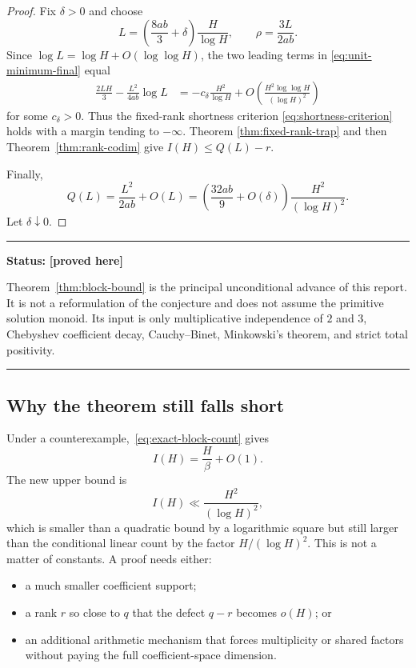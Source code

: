 \documentclass[11pt,oneside]{article}
\theoremstyle{definition}
\theoremstyle{remark}
\newcommand{\statusproved}{\textcolor{provedgreen}{\textbf{[proved here]}}}
\newenvironment{statusbox}[1]
{\begin{center}\begin{minipage}{0.94\textwidth}\raggedright\hrule\vspace{0.45em}\textbf{Status:} #1\par\vspace{0.35em}}
{\vspace{0.35em}\hrule\end{minipage}\end{center}}
\begin{document}
\begin{proof}
Fix $\delta>0$ and choose
\begin{equation}
 L=\left(\frac{8ab}{3}+\delta\right)\frac{H}{\log H},
 \qquad
 \rho=\frac{3L}{2ab}.
 \label{eq:Lchoice}
\end{equation}
Since $\log L=\log H+O(\log\log H)$, the two leading terms in
\eqref{eq:unit-minimum-final} equal
\begin{align*}
 \frac{2LH}{3}-\frac{L^2}{4ab}\log L
 &=-c_\delta\frac{H^2}{\log H}
   +O\!\left(\frac{H^2\log\log H}{(\log H)^2}\right)
\end{align*}
for some $c_\delta>0$.  Thus the fixed-rank shortness criterion
\eqref{eq:shortness-criterion} holds with a margin tending to $-\infty$.  Theorem
\ref{thm:fixed-rank-trap} and then Theorem~\ref{thm:rank-codim} give
$I(H)\le Q(L)-r$.

Finally,
\[
 Q(L)=\frac{L^2}{2ab}+O(L)
 =\left(\frac{32ab}{9}+O(\delta)\right)
   \frac{H^2}{(\log H)^2}.
\]
Let $\delta\downarrow0$.
\end{proof}

\begin{statusbox}{\statusproved}
Theorem~\ref{thm:block-bound} is the principal unconditional advance of this report.  It is
not a reformulation of the conjecture and does not assume the primitive solution monoid.  Its
input is only multiplicative independence of $2$ and $3$, Chebyshev coefficient decay,
Cauchy--Binet, Minkowski's theorem, and strict total positivity.
\end{statusbox}

\subsection{Why the theorem still falls short}

Under a counterexample,~\eqref{eq:exact-block-count} gives
\[
 I(H)=\frac{H}{\beta}+O(1).
\]
The new upper bound is
\[
 I(H)\ll\frac{H^2}{(\log H)^2},
\]
which is smaller than a quadratic bound by a logarithmic square but still larger than the
conditional linear count by the factor $H/(\log H)^2$.  This is not a matter of constants.
A proof needs either:

\begin{itemize}
\item a much smaller coefficient support;
\item a rank $r$ so close to $q$ that the defect $q-r$ becomes $o(H)$; or
\item an additional arithmetic mechanism that forces multiplicity or shared factors without
paying the full coefficient-space dimension.
\end{itemize}
\end{document}
